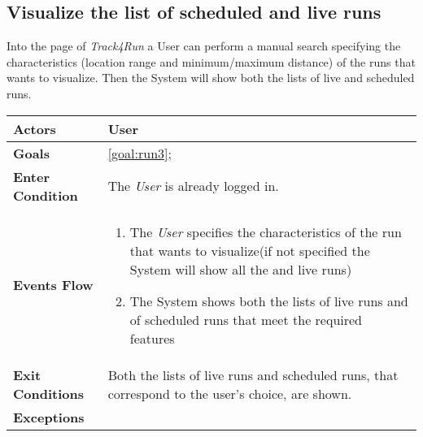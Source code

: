  \subsection{Visualize the list of scheduled and live runs}
Into the page of \emph{Track4Run} a User can perform a manual search specifying the characteristics (location range and minimum/maximum distance) of the runs that wants to visualize. Then the System will show both the lists of live and scheduled runs. 

\begin{table}[H]
	\centering
    
    \begin{tabular}{|p{3.5cm}|p{10.3cm}|}
    
    \hline
    \textbf{\large{Actors}}  			& \tabitem User 	\\
    				 					
    \hline
    \textbf{\large{Goals}} 				& \ref{goal:run3};\\
    
    \hline
    \textbf{\large{Enter Condition}}	& The \emph{User} is already logged in.		\\
    
    \hline
    \textbf{\large{Events Flow}}		& \begin{enumerate}[leftmargin=0.5cm]
                                          	\item The \emph{User} specifies the characteristics of the run that wants to visualize(if not specified the System will show all the  and live runs)  
                                          	 \item The System shows both the lists of live runs and of scheduled runs that meet the required features
                                          \end{enumerate}
    										\\
    \hline
    \textbf{\large{Exit Conditions}}    & Both the lists of live runs and scheduled runs, that correspond to the user's choice, are shown.  \\
    
    \hline
    \textbf{\large{Exceptions}} 		& \\
    
    \hline
    
    
    \end{tabular}
	
\end{table}